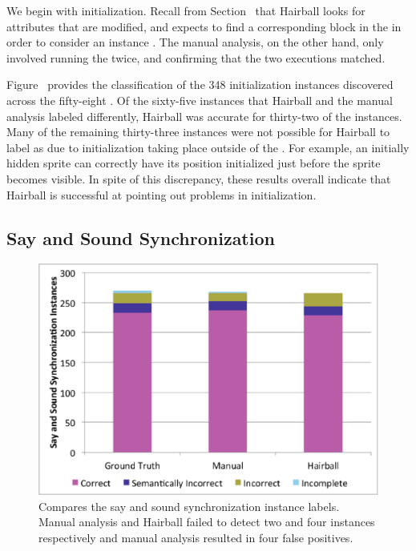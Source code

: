 We begin with initialization. Recall from Section~ that
Hairball looks for attributes that are modified, and expects to find a
corresponding \abs{} block in the \initzone{} in order to consider an instance
\correct{}. The manual analysis, on the other hand, only involved running the
\sprogram{} twice, and confirming that the two executions matched.

Figure~ provides the classification of the 348
initialization instances discovered across the fifty-eight . Of the
sixty-five instances that Hairball and the manual analysis labeled differently,
Hairball was accurate for thirty-two of the instances. Many of the remaining
thirty-three instances were not possible for Hairball to label as \correct{}
due to initialization taking place outside of the \initzone{}. For example, an
initially hidden sprite can correctly have its position initialized just before
the sprite becomes visible. In spite of this discrepancy, these results overall
indicate that Hairball is successful at pointing out problems in
initialization.

\subsection{Say and Sound Synchronization}
\begin{figure}[!t]
\centering
\includegraphics[trim=.3in .15in .3in .15in, clip,
  width=5.25in]{graphs/AutoSaySoundSync.eps}
\caption{Compares the say and sound synchronization instance labels. Manual
  analysis and Hairball failed to detect two and four instances respectively
  and manual analysis resulted in four false positives.}
\end{figure}


